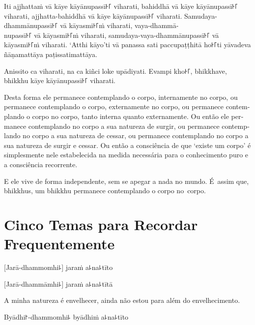 Iti ajjhattaṁ vā kāye kāyānupassī꜔꜒ viharati, bahiddhā vā kāye kāyānupassī꜔꜒
viharati, ajjhatta-bahiddhā vā kāye kāyānupassī꜔꜒ viharati. Samudaya-dhammānupassī꜔꜒
vā kāyasmi꜔꜒ṁ viharati, vaya-dhammā-\\
nupassī꜔꜒ vā kāyasmi꜔꜒ṁ viharati, samudaya-vaya-dhammānupassī꜔꜒ vā kāyasmi꜔꜒ṁ viharati.
‘Atthi kāyo’ti vā panassa sati paccupaṭṭhitā ho꜔꜒ti yāvadeva ñāṇamattāya
paṭissatimattāya.

Anissito ca viharati, na ca kiñci loke upādiyati. Evampi kho꜔꜒,
bhikkhave, bhikkhu kāye kāyānupassī꜔꜒ viharati.

\begin{english}
  Desta forma ele permanece contemplando o corpo, internamente no corpo, ou
  permanece contemplando o corpo, externamente no corpo, ou permanece
  contemplando o corpo no corpo, tanto interna quanto externamente. Ou então ele
  permanece contemplando no corpo a sua natureza de surgir, ou permanece
  contemplando no corpo a sua natureza de cessar, ou permanece contemplando no
  corpo a sua natureza de surgir e cessar. Ou então a consciência de que ‘existe
  um corpo’ é simplesmente nele estabelecida na medida necessária para o
  conhecimento puro e a consciência recorrente.

  \bigskip

  E ele vive de forma independente, sem se apegar a nada no mundo. É~assim que,
  bhikkhus, um bhikkhu permanece contemplando o corpo no~corpo.
\end{english}

\chapter[Cinco Temas]{Cinco Temas para Recordar Frequentemente}


\begin{leader}
\end{leader}

%
[Jarā-dhammomhi꜕] jaraṁ a꜕na꜕tīto

%
[Jarā-dhammāmhi꜕] jaraṁ a꜕na꜕tītā

\begin{english}
  A minha natureza é envelhecer, ainda não estou para além do envelhecimento.
\end{english}

%
Byādhi꜓-dhammomhi꜕ byādhiṁ a꜕na꜕tīto

